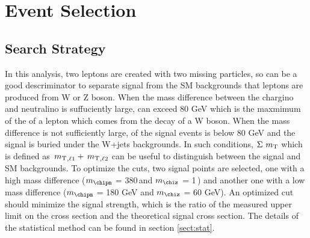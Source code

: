 \section{Event Selection}
\subsection{Search Strategy}
\label{sect:cuts}
In this analysis, two leptons are created with two missing particles, so \mttwo can be a good descriminator to separate signal 
from the SM backgrounds that leptons are produced from W or Z boson. When the mass difference between the chargino and neutralino 
is suffuciently large, \mttwo can exceed 80 GeV which is the maxmimum of the \mt of a lepton which comes from the decay of a W boson.
When the mass difference is not sufficiently large, \mttwo of the signal events is below 80 GeV and the signal is buried under the W+jets
backgrounds. In such conditions, $\Sigma\,\,{m_{\rm T}}$ which is defined as $\,{m_{\rm T}}_{,\ell1} + \,{m_{\rm T}}_{,\ell2}$ can be useful to distinguish between the signal and 
SM backgrounds.
To optimize the cuts, two signal points are selected, one with a high mass difference ($m_{\chipm}$ = 380\,\GeV and $m_{\chiz}$ = 1\,\GeV) and
another one with a low mass difference ($m_{\chipm}$ = 180 GeV and $m_{\chiz}$ = 60 GeV). An optimized cut should minimize the signal strength, 
which is the ratio of the measured upper limit on the cross section and the theoretical signal cross section. The details of the statistical 
method can be found in section \ref{sect:stat}.

